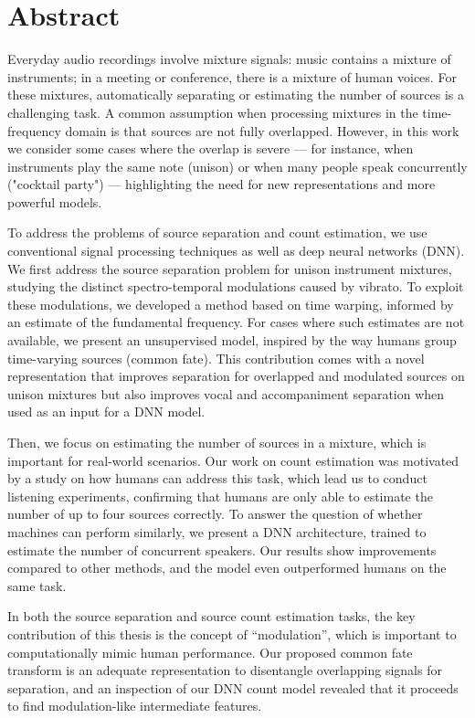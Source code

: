 \begingroup
\let\clearpage\relax
\let\cleardoublepage\relax
\let\cleardoublepage\relax

\chapter*{Abstract}
Everyday audio recordings involve mixture signals: music contains a mixture of instruments; in a meeting or conference, there is a mixture of human voices.
For these mixtures, automatically separating or estimating the number of sources is a challenging task.
A common assumption when processing mixtures in the time-frequency domain is that sources are not fully overlapped.
However, in this work we consider some cases where the overlap is severe --- for instance, when instruments play the same note (unison) or when many people speak concurrently ("cocktail party") --- highlighting the need for new representations and more powerful models.
\par
To address the problems of source separation and count estimation, we use conventional signal processing techniques as well as deep neural networks (DNN).
We first address the source separation problem for unison instrument mixtures, studying the distinct spectro-temporal modulations caused by vibrato.
To exploit these modulations, we developed a method based on time warping, informed by an estimate of the fundamental frequency.
For cases where such estimates are not available, we present an unsupervised model, inspired by the way humans group time-varying sources (common fate).
This contribution comes with a novel representation that improves separation for overlapped and modulated sources on unison mixtures but also improves vocal and accompaniment separation when used as an input for a DNN model.
\par
Then, we focus on estimating the number of sources in a mixture, which is important for real-world scenarios.
Our work on count estimation was motivated by a study on how humans can address this task, which lead us to conduct listening experiments, confirming that humans are only able to estimate the number of up to four sources correctly.
To answer the question of whether machines can perform similarly, we present a DNN architecture, trained to estimate the number of concurrent speakers.
Our results show improvements compared to other methods, and the model even outperformed humans on the same task.
\par
In both the source separation and source count estimation tasks, the key contribution of this thesis is the concept of ``modulation'', which is important to computationally mimic human performance.
Our proposed common fate transform is an adequate representation to disentangle overlapping signals for separation, and an inspection of our DNN count model revealed that it proceeds to find modulation-like intermediate features.
\vfill

